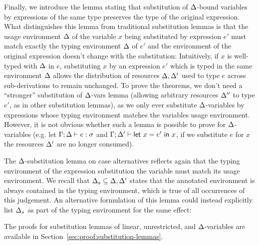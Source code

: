\documentclass[acmsmall, screen, review]{acmart}
\newcommand{\llet}[2]{\mathsf{let}~#1~\mathsf{in}~#2}
\begin{document}
Finally, we introduce the lemma stating that substitution of $\Delta$-bound
variables by expressions of the same type preserves the type of the original
expression.
%
What distinguishes this lemma from traditional substitution lemmas is that the
usage environment $\Delta$ of the variable $x$ being substituted by expression $e'$
must match exactly the typing environment $\Delta$ of $e'$ and the
environment of the original expression doesn't change with the substitution:
%
\DeltaSubstitutionLemma
%
\noindent Intuitively, if $x$ is well-typed with $\Delta$ in $e$, substituting $x$
by an expression $e'$ which is typed in the same environment $\Delta$ allows the
distribution of resources $\Delta,\Delta'$ used to type $e$ across sub-derivations to remain
unchanged. To prove the theorems, we don't need a ``stronger'' substitution of
$\Delta$-vars lemma (allowing arbitrary resources $\Delta''$ to type $e'$, as in other
substitution lemmas), as we only ever substitute $\Delta$-variables by expressions
whose typing environment matches the variables usage environment. However, it
is not obvious whether such a lemma is possible to prove for $\Delta$-variables
(e.g. let $\Gamma;\Delta \vdash e :\sigma$ and $\G; \D' \vdash \llet{x = e'}{x}$, if we
substitute $e$ for $x$ the resources $\Delta'$ are no longer consumed).

The $\Delta$-substitution lemma on case alternatives reflects again that the typing
environment of the expression substitution the variable must match its usage
environment. We recall that $\Delta_s \subseteq \Delta,\Delta'$ states that the annotated
environment is always contained in the typing environment, which is true of all
occurrences of this judgement. An alternative formulation of this lemma could
instead explicitly list $\Delta_s$ as part of the typing environment for the same
effect:

\DeltaSubstitutionAltsLemma

The proofs for substitution lemmas of linear, unrestricted, and
$\Delta$-variables are available in Section~\ref{sec:proof:substitution-lemmas}.

%
%
%
%
\end{document}
